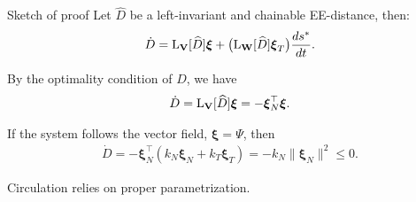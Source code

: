 \begin{frame}{Sketch of proof}
    Let $\widehat{D}$ be a left-invariant and chainable EE-distance, then:
    \begin{align*}
        \dot{D} = \operatorname{L}_\mathbf{V}[\widehat{D}]\boldsymbol{\xi} + \bigl(\operatorname{L}_\mathbf{W}[\widehat{D}]\boldsymbol{\xi}_T\bigr)\frac{ds^*}{dt}.
    \end{align*}

    By the optimality condition of $D$, we have
    \begin{align*}
        \dot{D} = \operatorname{L}_\mathbf{V}[\widehat{D}]\boldsymbol{\xi} = -\boldsymbol{\xi}_N^\top\boldsymbol{\xi}.
    \end{align*}

    If the system follows the vector field, $\boldsymbol{\xi}=\Psi$, then
    \begin{align*}
        \dot{D} = -\boldsymbol{\xi}_N^\top(k_N\boldsymbol{\xi}_N + k_T\boldsymbol{\xi}_T)
         =-k_N\|\boldsymbol{\xi}_N\|^2 \le 0.
    \end{align*}

    Circulation relies on proper parametrization.
    
\end{frame}

